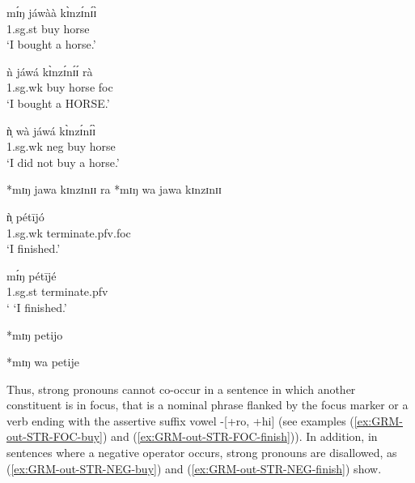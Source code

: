 \begin{exe}
\begin{exe}
\begin{exe}
{\begin{exe}
\begin{exe}
\begin{exe}
\begin{exe}
\begin{exe}
\begin{exe}
\begin{exe}
\begin{xlist}
  \ea\label{ex:GRM-weak-strong-arg}
  
   \ea\label{ex:}
\gll   mɪ́ŋ      jáwàà   kɪ̀nzɪ́nɪ́ɪ̀\\
     {\sc 1.sg.st}  buy  horse\\
\glt  `I bought a horse.' 
   
   
   \ex\label{ex:}
\gll    ǹ    jáwá kɪ̀nzɪ́nɪ́ɪ́ rà\\
     {\sc 1.sg.wk}  buy  horse  {\sc foc}  \\
\glt  `I bought a HORSE.'
   
   \ex\label{ex:}
\gll    ǹ̩    wà jáwá kɪ̀nzɪ́nɪ́ɪ̀\\
    {\sc 1.sg.wk} {\sc neg} buy  horse \\
\glt  `I did not buy a horse.' 
  
   \ex\label{ex:GRM-out-STR-FOC-buy}
    *mɪŋ      jawa   kɪnzɪnɪɪ ra
   \ex\label{ex:GRM-out-STR-NEG-buy}
     *mɪŋ    wa  jawa   kɪnzɪnɪɪ 

   
  \z 
 \z




  \ea\label{ex:GRM-weak-strong-verb}
   

   
   \ea\label{ex:}
\gll    ǹ̩   pétījó\\
    {\sc 1.sg.wk}  {terminate.{\sc pfv.foc}}  \\
\glt  `I finished.' 


   \ex\label{ex:}
\gll    mɪ́ŋ   pétījé\\
     {\sc  1.sg.st} {terminate.{\sc pfv}} \\
\glt  ` `I finished.'  

   \ex\label{ex:GRM-out-STR-FOC-finish}
  *mɪŋ   petijo

   \ex\label{ex:GRM-out-STR-NEG-finish}
  *mɪŋ   wa petije
         
   
  \z 
 \z

Thus, strong pronouns cannot co-occur in a sentence in which another
constituent is in focus, that is a nominal phrase  flanked by the focus
marker  or   a
verb ending with the assertive suffix vowel   {\sc -[+ro,  +hi]}    (see
examples 
(\ref{ex:GRM-out-STR-FOC-buy}) and (\ref{ex:GRM-out-STR-FOC-finish})). In
addition,  in
sentences 
where a negative operator occurs, strong pronouns are disallowed, as  
(\ref{ex:GRM-out-STR-NEG-buy}) and   (\ref{ex:GRM-out-STR-NEG-finish}) show.

  
  

\end{xlist}
\end{exe}
\end{exe}
\end{exe}
\end{exe}
\end{exe}
\end{exe}
\end{exe}}
\end{exe}
\end{exe}
\end{exe}
